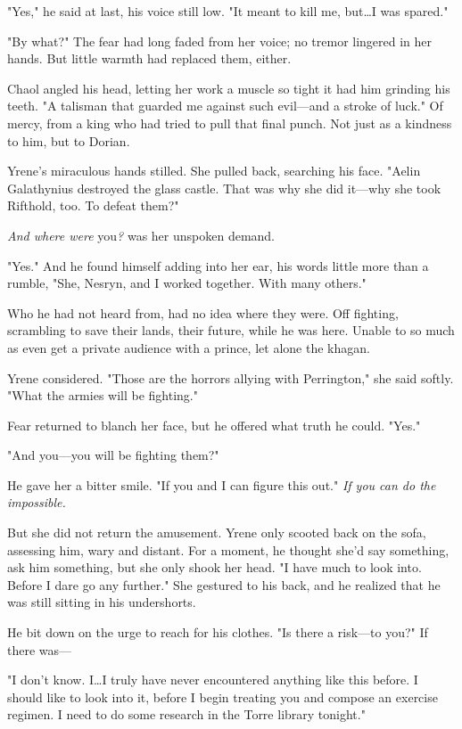 "Yes," he said at last, his voice still low.
"It meant to kill me, but\ldots I was spared."

"By what?"
The fear had long faded from her voice; no tremor lingered in her hands.
But little warmth had replaced them, either.

Chaol angled his head, letting her work a muscle so tight it had him grinding his teeth.
"A talisman that guarded me against such evil---and a stroke of luck."
Of mercy, from a king who had tried to pull that final punch.
Not just as a kindness to him, but to Dorian.

Yrene's miraculous hands stilled.
She pulled back, searching his face.
"Aelin Galathynius destroyed the glass castle.
That was why she did it---why she took Rifthold, too.
To defeat them?"

\emph{And where were} you\emph{?} was her unspoken demand.

"Yes."
And he found himself adding into her ear, his words little more than a rumble, "She, Nesryn, and I worked together.
With many others."

Who he had not heard from, had no idea where they were.
Off fighting, scrambling to save their lands, their future, while he was here.
Unable to so much as even get a private audience with a prince, let alone the khagan.

Yrene considered.
"Those are the horrors allying with Perrington," she said softly.
"What the armies will be fighting."

Fear returned to blanch her face, but he offered what truth he could.
"Yes."

"And you---you will be fighting them?"

He gave her a bitter smile.
"If you and I can figure this out."
\emph{If you can do the impossible.}

But she did not return the amusement.
Yrene only scooted back on the sofa, assessing him, wary and distant.
For a moment, he thought she'd say something, ask him something, but she only shook her head.
"I have much to look into.
Before I dare go any further."
She gestured to his back, and he realized that he was still sitting in his undershorts.

He bit down on the urge to reach for his clothes.
"Is there a risk---to you?"
If there was---

"I don't know.
I\ldots I truly have never encountered anything like this before.
I should like to look into it, before I begin treating you and compose an exercise regimen.
I need to do some research in the Torre library tonight."

